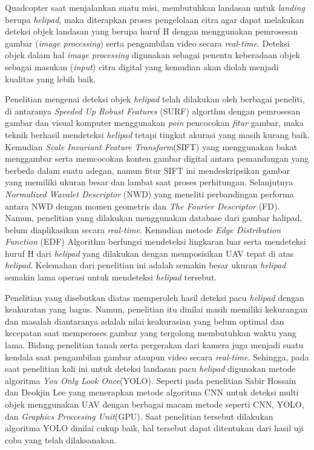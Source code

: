 Quadcopter saat menjalankan suatu misi, membutuhkan landasan untuk \textit{landing} berupa \textit{helipad}, maka diterapkan proses pengelolaan citra agar dapat melakukan deteksi objek landasan yang berupa huruf H dengan menggunakan pemrosesan gambar (\textit{image processing}) serta pengambilan video secara \textit{real-time}. Deteksi objek dalam hal \textit{image processing} digunakan sebagai penentu keberadaan objek sebagai masukan (\textit{input}) citra digital yang kemudian akan diolah menjadi kualitas yang lebih baik\cite{mulyawan2011identifikasi}.
 
Penelitian mengenai deteksi objek \textit{helipad} telah dilakukan oleh berbagai peneliti, di antaranya \textit{Speeded Up Robust Features} (SURF) algorthm dengan pemrosesan gambar dan visual komputer menggunakan \textit{poin} pencocokan \textit{fitur} gambar, maka teknik berhasil mendeteksi \textit{helipad} tetapi tingkat akurasi yang masih kurang baik\cite{prakash2016autonomous}. Kemudian \textit{Scale Invariant Feature Transform}(SIFT) yang menggunakan bakat menggambar serta memcocokan konten gambar digital antara pemandangan yang berbeda dalam suatu adegan, namun fitur SIFT ini mendeskripsikan gambar yang memiliki ukuran besar dan lambat saat proses perhitungan\cite{cesetti2009vision}. Selanjutnya \textit{Normalized Wavalet Descriptor} (NWD) yang meneliti perbandingan performa antara NWD dengan momen geometris dan \textit{The Fourier Descriptor} (FD). Namun, penelitian yang dilakukan menggunakan database dari gambar halipad, belum diaplikasikan secara \textit{real-time}\cite{nsogo2007robust}. Kemudian metode \textit{Edge Distribution Function} (EDF) Algorithm berfungsi mendeteksi lingkaran luar serta mendeteksi huruf H dari \textit{helipad} yang dilakukan dengan memposisikan UAV tepat di atas \textit{helipad}. Kelemahan dari penelitian ini adalah semakin besar ukuran \textit{helipad} semakin lama operasi untuk mendeteksi \textit{helipad} tersebut\cite{lee2012implementation}.

Penelitian yang disebutkan diatas memperoleh hasil deteksi pacu \textit{helipad} dengan keakuratan yang bagus. Namun, penelitian itu dinilai masih memiliki kekurangan dan masalah diantaranya adalah nilai keakurasian yang belum optimal dan kecepatan saat memperoses gambar yang tergolong membutuhkan waktu yang lama. Bidang penelitian tanah serta pergerakan dari kamera juga menjadi suatu kendala saat pengambilan gambar ataupun video secara \textit{real-time}. Sehingga, pada saat penelitian kali ini untuk deteksi landasan pacu \textit{helipad} digunakan metode algoritma \textit{You Only Look Once}(YOLO). Seperti pada penelitian Sabir Hossain dan Deokjin Lee\cite{hossain2019deep} yang menerapkan metode algoritma CNN untuk deteksi multi objek menggunakan UAV dengan berbagai macam metode seperti CNN, YOLO, dan \textit{Graphics Proccesing Unit}(GPU). Saat penelitian tersebut dilakukan algoritma YOLO dinilai cukup baik, hal tersebut dapat ditentukan dari hasil uji coba yang telah dilaksanakan.

